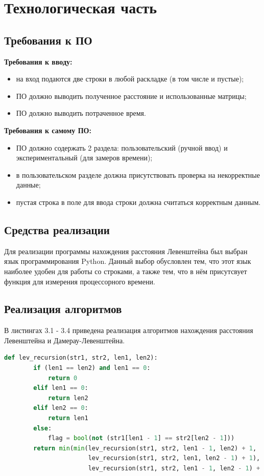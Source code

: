 \documentclass[12pt]{report}
\begin{document}
	\chapter{Технологическая часть}
	
	\section{Требования к ПО}
	\textbf{Требования к вводу:}
	\begin{itemize}
		\item на вход подаются две строки в любой раскладке (в том числе и пустые);
		\item ПО должно выводить полученное расстояние и использованные матрицы;
		\item ПО должно выводить потраченное время.
	\end{itemize}
	\textbf{Требования к самому ПО:}
	\begin{itemize}
		\item ПО должно содержать 2 раздела: пользовательский (ручной ввод) и экспериментальный (для замеров времени);
		\item в пользовательском разделе должна присутствовать проверка на некорректные данные;
		\item пустая строка в поле для ввода строки должна считаться корректным данным.
	\end{itemize}
	
	\section{Средства реализации}
	Для реализации программы нахождения расстояния Левенштейна был выбран язык программирования Python. Данный выбор обусловлен тем, что этот язык наиболее удобен для работы со строками, а также тем, что в нём присутсвует функция для измерения процессорного времени.
	
	\section{Реализация алгоритмов}
	
	В листингах 3.1 - 3.4 приведена реализация алгоритмов нахождения расстояния Левенштейна и Дамерау-Левенштейна.
	
	\begin{lstlisting}[label=some-code,caption=Функция нахождения расстояния Левенштейна рекурсивно,language=Python]
	def lev_recursion(str1, str2, len1, len2):
		if (len1 == len2) and len1 == 0:
			return 0
		elif len1 == 0:
			return len2
		elif len2 == 0:
			return len1
		else:
			flag = bool(not (str1[len1 - 1] == str2[len2 - 1]))
		return min(min(lev_recursion(str1, str2, len1 - 1, len2) + 1,
					   lev_recursion(str1, str2, len1, len2 - 1) + 1),
					   lev_recursion(str1, str2, len1 - 1, len2 - 1) + flag)
	\end{lstlisting}
	
\end{document}
